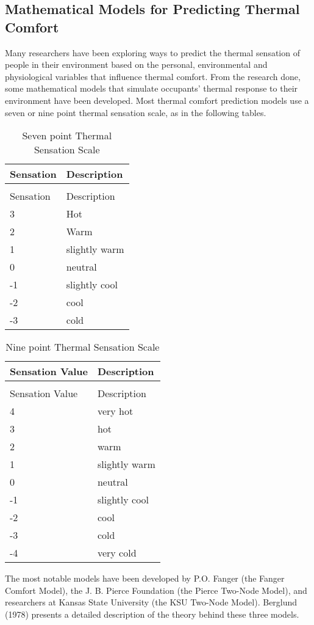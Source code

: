 \subsection{Mathematical Models for Predicting Thermal Comfort}\label{mathematical-models-for-predicting-thermal-comfort}

Many researchers have been exploring ways to predict the thermal sensation of people in their environment based on the personal, environmental and physiological variables that influence thermal comfort. From the research done, some mathematical models that simulate occupants' thermal response to their environment have been developed. Most thermal comfort prediction models use a seven or nine point thermal sensation scale, as in the following tables.

\begin{longtable}[c]{@{}ll@{}}
\caption{Seven point Thermal Sensation Scale \label{table:seven-point-thermal-sensation-scale}} \tabularnewline
\toprule 
Sensation & Description \tabularnewline
\midrule
\endfirsthead

\caption[]{Seven point Thermal Sensation Scale} \tabularnewline
\toprule 
Sensation & Description \tabularnewline
\midrule
\endhead

3 & Hot \tabularnewline
2 & Warm \tabularnewline
1 & slightly warm \tabularnewline
0 & neutral \tabularnewline
-1 & slightly cool \tabularnewline
-2 & cool \tabularnewline
-3 & cold \tabularnewline
\bottomrule
\end{longtable}

\begin{longtable}[c]{@{}ll@{}}
\caption{Nine point Thermal Sensation Scale \label{table:nine-point-thermal-sensation-scale}} \tabularnewline
\toprule 
Sensation Value & Description \tabularnewline
\midrule
\endfirsthead

\caption[]{Nine point Thermal Sensation Scale} \tabularnewline
\toprule 
Sensation Value & Description \tabularnewline
\midrule
\endhead

4 & very hot \tabularnewline
3 & hot \tabularnewline
2 & warm \tabularnewline
1 & slightly warm \tabularnewline
0 & neutral \tabularnewline
-1 & slightly cool \tabularnewline
-2 & cool \tabularnewline
-3 & cold \tabularnewline
-4 & very cold \tabularnewline
\bottomrule
\end{longtable}

The most notable models have been developed by P.O. Fanger (the Fanger Comfort Model), the J. B. Pierce Foundation (the Pierce Two-Node Model), and researchers at Kansas State University (the KSU Two-Node Model). Berglund (1978) presents a detailed description of the theory behind these three models.


